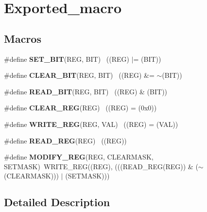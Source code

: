 \hypertarget{group___exported__macro}{}\section{Exported\+\_\+macro}
\label{group___exported__macro}
\subsection*{Macros}
\begin{DoxyCompactItemize}
\item 
\#define {\bfseries S\+E\+T\+\_\+\+B\+IT}(R\+EG,  B\+IT)      ~((R\+EG) $\vert$= (B\+IT))\hypertarget{group___exported__macro_gafe96f32216ed830403db91a8b7d800ab}{}\label{group___exported__macro_gafe96f32216ed830403db91a8b7d800ab}

\item 
\#define {\bfseries C\+L\+E\+A\+R\+\_\+\+B\+IT}(R\+EG,  B\+IT)  ~((R\+EG) \&= $\sim$(B\+IT))\hypertarget{group___exported__macro_ga4c7b1529ef62c6310390108b0efc2bf0}{}\label{group___exported__macro_ga4c7b1529ef62c6310390108b0efc2bf0}

\item 
\#define {\bfseries R\+E\+A\+D\+\_\+\+B\+IT}(R\+EG,  B\+IT)    ~((R\+EG) \& (B\+IT))\hypertarget{group___exported__macro_ga8e897a88f6313cd46cf96224a47f11bf}{}\label{group___exported__macro_ga8e897a88f6313cd46cf96224a47f11bf}

\item 
\#define {\bfseries C\+L\+E\+A\+R\+\_\+\+R\+EG}(R\+EG)            ~((R\+EG) = (0x0))\hypertarget{group___exported__macro_gad659fe5750e80990cb29b7b69562536e}{}\label{group___exported__macro_gad659fe5750e80990cb29b7b69562536e}

\item 
\#define {\bfseries W\+R\+I\+T\+E\+\_\+\+R\+EG}(R\+EG,  V\+AL)  ~((R\+EG) = (V\+AL))\hypertarget{group___exported__macro_gaf244d5e7076977aaa554cf2dab8bdbaa}{}\label{group___exported__macro_gaf244d5e7076977aaa554cf2dab8bdbaa}

\item 
\#define {\bfseries R\+E\+A\+D\+\_\+\+R\+EG}(R\+EG)              ~((R\+EG))\hypertarget{group___exported__macro_gaddb3cc7b2dc9c558f8fdb7b6fae4ec41}{}\label{group___exported__macro_gaddb3cc7b2dc9c558f8fdb7b6fae4ec41}

\item 
\#define {\bfseries M\+O\+D\+I\+F\+Y\+\_\+\+R\+EG}(R\+EG,  C\+L\+E\+A\+R\+M\+A\+SK,  S\+E\+T\+M\+A\+SK)~W\+R\+I\+T\+E\+\_\+\+R\+EG((R\+EG), (((R\+E\+A\+D\+\_\+\+R\+EG(R\+EG)) \& ($\sim$(C\+L\+E\+A\+R\+M\+A\+SK))) $\vert$ (S\+E\+T\+M\+A\+SK)))\hypertarget{group___exported__macro_ga6553c99f510c3bab8cc0a91602053247}{}\label{group___exported__macro_ga6553c99f510c3bab8cc0a91602053247}

\end{DoxyCompactItemize}


\subsection{Detailed Description}
